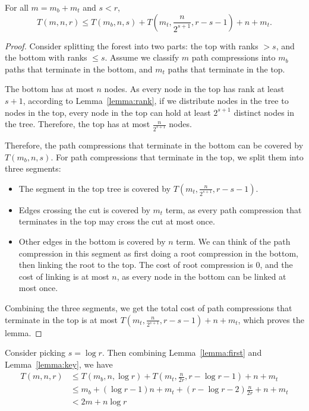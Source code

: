 \begin{lemma}
	For all $m = m_b+m_t$ and $s < r$,
	\[ T(m,n,r) \leq T(m_b, n, s) + T(m_t, \frac{n}{2^{s+1}}, r-s-1) + n + m_t .\]\label{lemma:key}
\end{lemma}
\begin{proof}
	Consider splitting the forest into two parts: the top with ranks $> s$, and the bottom with ranks $\leq s$. Assume we classify $m$ path compressions into $m_b$ paths that terminate in the bottom, and $m_t$ paths that terminate in the top.

	The bottom has at most $n$ nodes. As every node in the top has rank at least $s+1$, according to Lemma~\ref{lemma:rank}, if we distribute nodes in the tree to nodes in the top, every node in the top can hold at least $2^{s+1}$ distinct nodes in the tree. Therefore, the top has at most $\frac{n}{2^{s+1}}$ nodes.

	Therefore, the path compressions that terminate in the bottom can be covered by $T(m_b, n, s)$. For path compressions that terminate in the top, we split them into three segments:
	\begin{itemize}
		\item The segment in the top tree is covered by $T(m_t, \frac{n}{2^{s+1}}, r-s-1)$.
		\item Edges crossing the cut is covered by $m_t$ term, as every path compression that terminates in the top may cross the cut at most once.
		\item Other edges in the bottom is covered by $n$ term. We can think of the path compression in this segment as first doing a root compression in the bottom, then linking the root to the top. The cost of root compression is $0$, and the cost of linking is at most $n$, as every node in the bottom can be linked at most once.
	\end{itemize}
	Combining the three segments, we get the total cost of path compressions that terminate in the top is at most $T(m_t, \frac{n}{2^{s+1}}, r-s-1) + n + m_t$, which proves the lemma.
\end{proof}

Consider picking $s = \log r$. Then combining Lemma~\ref{lemma:first} and Lemma~\ref{lemma:key}, we have
\begin{align*}
	T(m,n,r) & \leq T(m_b, n, \log r) + T(m_t, \frac{n}{2r}, r-\log r - 1) + n + m_t \\
	         & \leq m_b + (\log r - 1)n + m_t + (r-\log r - 2)\frac{n}{2r} + n + m_t \\
	         & < 2m+n\log r
\end{align*}

